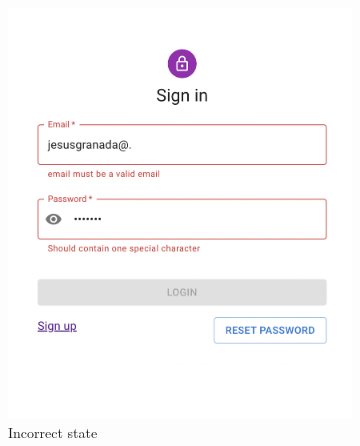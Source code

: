     \begin{figure}[H]
        \centering
        \begin{subfigure}[T]{0.49\textwidth}
            \centering
            \includegraphics[width=\textwidth]{assets/form_incorrect.png}
            \caption{Incorrect state}
            \label{fig:impl_form_incorrect}
        \end{subfigure}
        \hfill
        \begin{subfigure}[T]{0.49\textwidth}
            \centering

\end{subfigure}
\end{figure}
